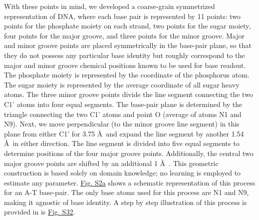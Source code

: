 With these points in mind, we developed a coarse-grain symmetrized representation of DNA, where each base pair is represented by 11 points: two points for the phosphate moiety on each strand, two points for the sugar moiety, four points for the major groove, and three points for the minor groove. Major and minor groove points are placed symmetrically in the base-pair plane, so that they do not possess any particular base identity but roughly correspond to the major and minor groove chemical positions known \citep{Chiu2023} to be used for base readout. The phosphate moiety is represented by the coordinate of the phosphorus atom. The sugar moiety is represented by the average coordinate of all sugar heavy atoms. The three minor groove points divide the line segment connecting the two C1' atoms into four equal segments. The base-pair plane is determined by the triangle connecting the two C1' atoms and point O (average of atoms N1 and N9). Next, we move perpendicular (to the minor groove line segment) in this plane from either C1' for 3.75 \AA\  and expand the line segment by another 1.54 \AA\  in either direction. The line segment is divided into five equal segments to determine positions of the four major groove points. Additionally, the central two major groove points are shifted by an additional 1 \AA\ . This geometric construction is based solely on domain knowledge; no learning is employed to estimate any parameter. \hyperref[fig:pdnaS2]{Fig. S2a} shows a schematic representation of this process for an A-T base-pair. The only base atoms used for this process are N1 and N9, making it agnostic of base identity. A step by step illustration of this process is provided in is \hyperref[fig:pdnaS32]{Fig. S32}.

